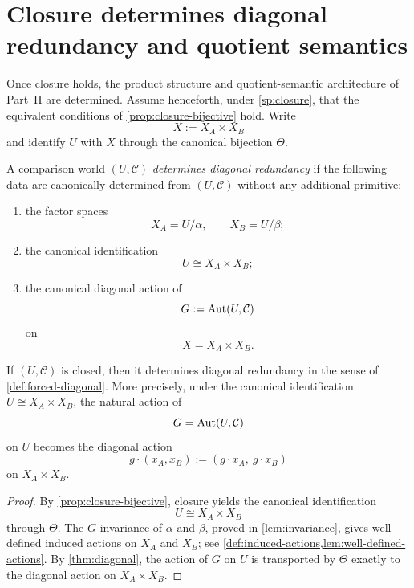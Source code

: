 \section{Closure determines diagonal redundancy and quotient semantics}
\label{sec:closure-forces}
Once closure holds, the product structure and quotient-semantic
architecture of Part~II are determined.
Assume henceforth, under \cref{sp:closure}, that the equivalent conditions of
\cref{prop:closure-bijective} hold. Write
\[
	X:=X_A\times X_B
\]
and identify \(U\) with \(X\) through the canonical bijection
\(\Theta\).
\begin{definition}
	\label{def:forced-diagonal}
	A comparison world \((U,\mathcal C)\) \emph{determines diagonal redundancy}
	if the following data are canonically determined from \((U,\mathcal C)\)
	without any additional primitive:
	\begin{enumerate}[label=\textup{(\roman*)}]
		\item the factor spaces
		      \[
			      X_A=U/\alpha,
			      \qquad
			      X_B=U/\beta;
		      \]
		\item the canonical identification
		      \[
			      U\cong X_A\times X_B;
		      \]
		\item the canonical diagonal action of
		      \[
			      G:=\operatorname{Aut}(U,\mathcal C)
		      \]
		      on
		      \[
			      X=X_A\times X_B.
		      \]
	\end{enumerate}
\end{definition}
\begin{proposition}
	\label{prop:forced-diagonal-action}
	If \((U,\mathcal C)\) is closed, then it determines diagonal redundancy in
	the sense of \cref{def:forced-diagonal}. More precisely, under the
	canonical identification \(U\cong X_A\times X_B\), the natural action of
	\[
		G=\operatorname{Aut}(U,\mathcal C)
	\]
	on \(U\) becomes the diagonal action
	\[
		g\cdot(x_A,x_B):=(g\cdot x_A,\ g\cdot x_B)
	\]
	on \(X_A\times X_B\).
\end{proposition}
\begin{proof}
	By \cref{prop:closure-bijective}, closure yields the canonical
	identification
	\[
		U\cong X_A\times X_B
	\]
	through \(\Theta\). The \(G\)-invariance of \(\alpha\) and \(\beta\),
	proved in \cref{lem:invariance}, gives well-defined induced actions on
	\(X_A\) and \(X_B\); see
	\cref{def:induced-actions,lem:well-defined-actions}. By
	\cref{thm:diagonal}, the action of \(G\) on \(U\) is transported by
	\(\Theta\) exactly to the diagonal action on \(X_A\times X_B\).
\end{proof}
